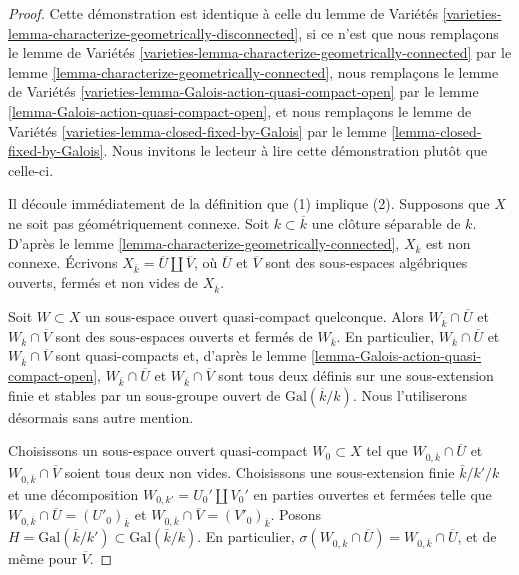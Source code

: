 \begin{proof}
Cette démonstration est identique à celle du
lemme de Variétés \ref{varieties-lemma-characterize-geometrically-disconnected},
si ce n'est que
nous remplaçons le
lemme de Variétés \ref{varieties-lemma-characterize-geometrically-connected}
par le lemme \ref{lemma-characterize-geometrically-connected},
nous remplaçons le
lemme de Variétés \ref{varieties-lemma-Galois-action-quasi-compact-open}
par le lemme \ref{lemma-Galois-action-quasi-compact-open}, et
nous remplaçons le
lemme de Variétés \ref{varieties-lemma-closed-fixed-by-Galois}
par le lemme \ref{lemma-closed-fixed-by-Galois}.
Nous invitons le lecteur à lire cette démonstration plutôt que celle-ci.

\medskip\noindent
Il découle immédiatement de la définition que (1) implique (2).
Supposons que $X$ ne soit pas géométriquement connexe.
Soit $k \subset \overline{k}$ une clôture séparable
de $k$. D'après le
lemme \ref{lemma-characterize-geometrically-connected},
$X_{\overline{k}}$ est non connexe.
Écrivons $X_{\overline{k}} = \overline{U} \amalg \overline{V}$,
où $\overline{U}$ et $\overline{V}$ sont des sous-espaces algébriques ouverts, fermés et non vides
de $X_{\overline{k}}$.

\medskip\noindent
Soit $W \subset X$ un sous-espace ouvert quasi-compact quelconque.
Alors $W_{\overline{k}} \cap \overline{U}$ et
$W_{\overline{k}} \cap \overline{V}$ sont des sous-espaces ouverts et fermés de
$W_{\overline{k}}$. En particulier, $W_{\overline{k}} \cap \overline{U}$ et
$W_{\overline{k}} \cap \overline{V}$ sont quasi-compacts et, d'après le
lemme \ref{lemma-Galois-action-quasi-compact-open},
$W_{\overline{k}} \cap \overline{U}$ et
$W_{\overline{k}} \cap \overline{V}$
sont tous deux définis sur une sous-extension finie et stables par un
sous-groupe ouvert de $\text{Gal}(\overline{k}/k)$.
Nous l'utiliserons désormais sans autre mention.

\medskip\noindent
Choisissons un sous-espace ouvert quasi-compact $W_0 \subset X$ tel que
$W_{0, \overline{k}} \cap \overline{U}$ et
$W_{0, \overline{k}} \cap \overline{V}$ soient tous deux non vides.
Choisissons une sous-extension finie $\overline{k}/k'/k$
et une décomposition $W_{0, k'} = U_0' \amalg V_0'$ en parties ouvertes et fermées
telle que
$W_{0, \overline{k}} \cap \overline{U} = (U'_0)_{\overline{k}}$ et
$W_{0, \overline{k}} \cap \overline{V} = (V'_0)_{\overline{k}}$.
Posons $H = \text{Gal}(\overline{k}/k') \subset \text{Gal}(\overline{k}/k)$.
En particulier,
$\sigma(W_{0, \overline{k}} \cap \overline{U}) =
W_{0, \overline{k}} \cap \overline{U}$, et de même pour
$\overline{V}$.


\end{proof}
